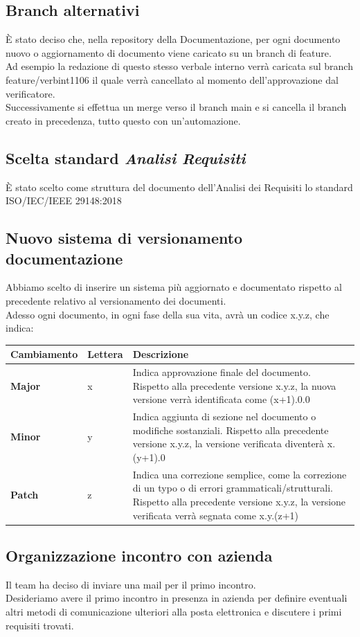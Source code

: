 \subsection{Branch alternativi}
È stato deciso che, nella repository della Documentazione, per ogni documento nuovo o aggiornamento di documento viene caricato su un branch di feature.\\
Ad esempio la redazione di questo stesso verbale interno verrà caricata sul branch feature/verbint1106 il quale verrà cancellato al momento dell'approvazione dal verificatore.\\
Successivamente si effettua un merge verso il branch main e si cancella il branch creato in precedenza, tutto questo con un'automazione.
\subsection{Scelta standard \textit{Analisi Requisiti}}
È stato scelto come struttura del documento dell'Analisi dei Requisiti lo standard ISO/IEC/IEEE 29148:2018
\subsection{Nuovo sistema di versionamento documentazione}
Abbiamo scelto di inserire un sistema più aggiornato e documentato rispetto al precedente relativo al versionamento dei documenti.\\
Adesso ogni documento, in ogni fase della sua vita, avrà un codice x.y.z, che indica: \\

\begin{tabular}{|p{}|p{}|p{}|}
	\hline
	Cambiamento & Lettera & Descrizione \\
	\hline
	\textbf{Major} & x & Indica approvazione finale del documento. Rispetto alla precedente versione x.y.z, la nuova versione verrà identificata come (x+1).0.0 \\
	\hline
	\textbf{Minor} & y & Indica aggiunta di sezione nel documento o modifiche sostanziali. Rispetto alla precedente versione x.y.z, la versione verificata diventerà x.(y+1).0\\
	\hline
	\textbf{Patch} & z & Indica una correzione semplice, come la correzione di un typo o di errori grammaticali/strutturali. Rispetto alla precedente versione x.y.z, la versione verificata verrà segnata come x.y.(z+1)\\
	\hline
\end{tabular}

\subsection{Organizzazione incontro con azienda}
Il team ha deciso di inviare una mail per il primo incontro.\\
Desideriamo avere il primo incontro in presenza in azienda per definire eventuali altri metodi di comunicazione ulteriori alla posta elettronica e discutere i primi requisiti trovati.